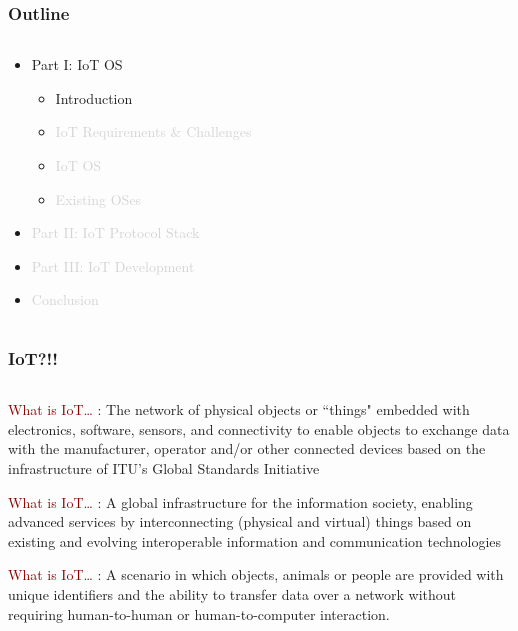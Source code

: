 \documentclass{beamer}
\begin{document}
\begin{frame}
	\frametitle{Outline}
	\begin{columns}[c]
		\begin{column}{30cm}
			\vspace{.1cm}
			\begin{itemize}
				\justifying
				\item Part I: IoT OS
				\begin{itemize}
					\item Introduction
					\item \textcolor{LightGray}{IoT Requirements \& Challenges}
					\item \textcolor{LightGray}{IoT OS}
					\item \textcolor{LightGray}{Existing OSes}
				\end{itemize}
				\item \textcolor{LightGray}{Part II: IoT Protocol Stack}
				\item \textcolor{LightGray}{Part III: IoT Development}
				\item \textcolor{LightGray}{Conclusion}
			\end{itemize}
		\end{column}
	\end{columns}
\end{frame}

\begin{frame}
	\frametitle{IoT?!!}
	\begin{columns}
		\begin{column}{12cm}
			\begin{block}{\centering\textcolor{darkred}{What is IoT\ldots}}
				\justifying
				[Wikipedia]: The network of physical objects or ``things" embedded with electronics, 	
				software, sensors, and connectivity to enable objects to exchange data with the
				manufacturer, operator and/or other connected devices based on the infrastructure of
				ITU's Global Standards Initiative
			\end{block}

			\begin{block}{\centering\textcolor{darkred}{What is IoT\ldots}}
				\justifying
				[ITU]: A global infrastructure for the information society, enabling advanced services
				by interconnecting (physical and virtual) things based on existing and evolving 		
				interoperable information and communication technologies
			\end{block}
			
			\begin{block}{\centering\textcolor{darkred}{What is IoT\ldots}}
				\justifying
				[WhatIs]: A scenario in which objects, animals or people are provided with unique
				identifiers and the ability to transfer data over a network without requiring 
				human-to-human or human-to-computer interaction.
			\end{block}
			
		\end{column}
	\end{columns}
\end{frame}
\end{document}
